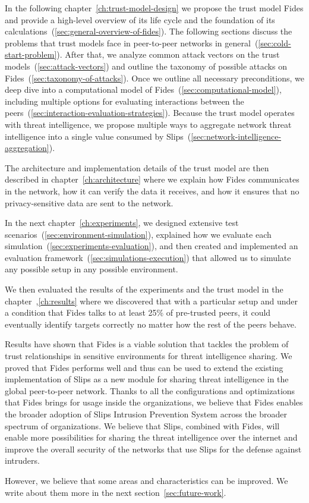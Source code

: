 In the following chapter~\ref{ch:trust-model-design} we propose the trust model Fides and provide a high-level overview of its life cycle and the foundation of its calculations~(\ref{sec:general-overview-of-fides}).
The following sections discuss the problems that trust models face in peer-to-peer networks in general~(\ref{sec:cold-start-problem}).
After that, we analyze common attack vectors on the trust models~(\ref{sec:attack-vectors}) and outline the taxonomy of possible attacks on Fides~(\ref{sec:taxonomy-of-attacks}).
Once we outline all necessary preconditions, we deep dive into a computational model of Fides~(\ref{sec:computational-model}), including multiple options for evaluating interactions between the peers~(\ref{sec:interaction-evaluation-strategies}).
Because the trust model operates with threat intelligence, we propose multiple ways to aggregate network threat intelligence into a single value consumed by Slips~(\ref{sec:network-intelligence-aggregation}).

The architecture and implementation details of the trust model are then described in chapter~\ref{ch:architecture} where we explain how Fides communicates in the network, how it can verify the data it receives, and how it ensures that no privacy-sensitive data are sent to the network.

In the next chapter~\ref{ch:experiments}, we designed extensive test scenarios~(\ref{sec:environment-simulation}), explained how we evaluate each simulation~(\ref{sec:experiments-evaluation}), and then created and implemented an evaluation framework~(\ref{sec:simulations-execution}) that allowed us to simulate any possible setup in any possible environment.

We then evaluated the results of the experiments and the trust model in the chapter~,\ref{ch:results} where we discovered that with a particular setup and under a condition that Fides talks to at least 25\% of pre-trusted peers, it could eventually identify targets correctly no matter how the rest of the peers behave.

Results have shown that Fides is a viable solution that tackles the problem of trust relationships in sensitive environments for threat intelligence sharing. 
We proved that Fides performs well and thus can be used to extend the existing implementation of Slips as a new module for sharing threat intelligence in the global peer-to-peer network.
Thanks to all the configurations and optimizations that Fides brings for usage inside the organizations, we believe that Fides enables the broader adoption of Slips Intrusion Prevention System across the broader spectrum of organizations.
We believe that Slips, combined with Fides, will enable more possibilities for sharing the threat intelligence over the internet and improve the overall security of the networks that use Slips for the defense against intruders.

However, we believe that some areas and characteristics can be improved. We write about them more in the next section~\ref{sec:future-work}.

